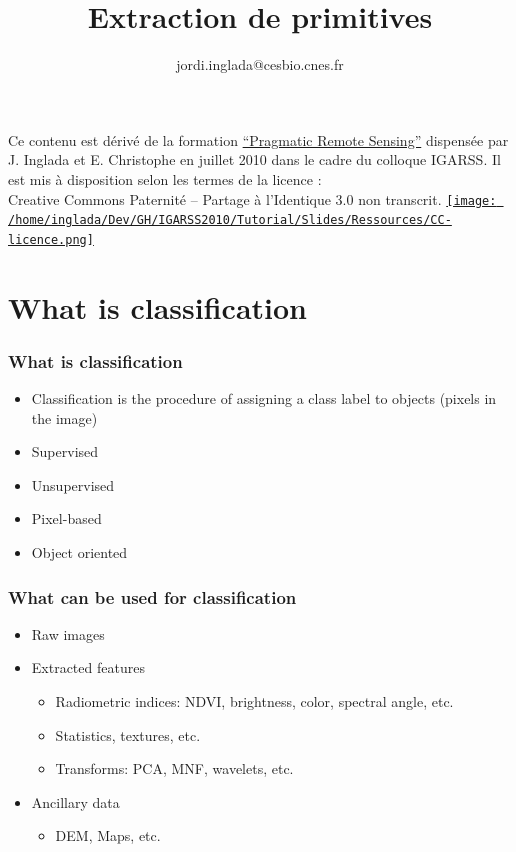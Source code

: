 \documentclass[compress]{beamer}
\title{Extraction de primitives}
\author
{jordi.inglada@cesbio.cnes.fr}
\institute[Cesbio] %
{\textsc{Centre d'Études Spatiales de la Biosphère, Toulouse, France}}
\date{}
\begin{document}
\begin{frame}
  \titlepage
  \begin{center}
{\tiny Ce contenu est dérivé de la formation \href{http://www.orfeo-toolbox.org/packages/PragmaticRemoteSensing-handout.pdf}{``Pragmatic Remote
  Sensing''} dispensée par J. Inglada et E. Christophe en juillet 2010
  dans le cadre du colloque IGARSS. Il est mis à disposition selon les termes de la licence :\\
Creative Commons Paternité – Partage à l’Identique 3.0 non transcrit.} \href{http://creativecommons.org/licenses/by-sa/3.0/}{\texttt{[image: /home/inglada/Dev/GH/IGARSS2010/Tutorial/Slides/Ressources/CC-licence.png]}}    
  \end{center}
\end{frame}


\section[Intro]{What is classification}
\begin{frame}
\frametitle{What is classification}
  \begin{itemize}
  \item Classification is the procedure of assigning a class label to
    objects (pixels in the image)
  \item Supervised
  \item Unsupervised
  \item Pixel-based
  \item Object oriented
  \end{itemize}
\end{frame}

\begin{frame}
  \frametitle{What can be used for classification}
  \begin{itemize}
  \item Raw images
  \item Extracted features
    \begin{itemize}
    \item Radiometric indices: NDVI, brightness, color, spectral
      angle, etc.
    \item Statistics, textures, etc.
    \item Transforms: PCA, MNF, wavelets, etc.
    \end{itemize}
  \item Ancillary data
    \begin{itemize}
    \item DEM, Maps, etc.
    \end{itemize}
  \end{itemize}
\end{frame}
\end{document}
